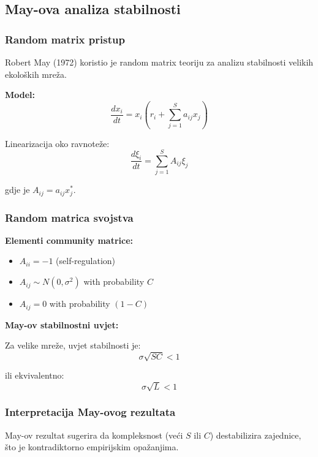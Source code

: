 \documentclass[11pt,oneside]{book}
\begin{document}
\subsection{May-ova analiza stabilnosti}

\subsubsection{Random matrix pristup}

Robert May (1972) koristio je random matrix teoriju za analizu stabilnosti velikih ekoloških mreža.

\textbf{Model:}
\begin{equation}
	\frac{dx_i}{dt} = x_i \left(r_i + \sum_{j=1}^{S} a_{ij} x_j\right)
\end{equation}

Linearizacija oko ravnoteže:
\begin{equation}
	\frac{d\xi_i}{dt} = \sum_{j=1}^{S} A_{ij} \xi_j
\end{equation}

gdje je $A_{ij} = a_{ij} x_j^*$.

\subsubsection{Random matrica svojstva}

\textbf{Elementi community matrice:}
\begin{itemize}
	\item $A_{ii} = -1$ (self-regulation)
	\item $A_{ij} \sim N(0, \sigma^2)$ with probability $C$
	\item $A_{ij} = 0$ with probability $(1-C)$
\end{itemize}

\textbf{May-ov stabilnostni uvjet:}

Za velike mreže, uvjet stabilnosti je:
\begin{equation}
	\sigma \sqrt{SC} < 1
\end{equation}

ili ekvivalentno:
\begin{equation}
	\sigma \sqrt{L} < 1
\end{equation}

\subsubsection{Interpretacija May-ovog rezultata}

May-ov rezultat sugerira da kompleksnost (veći $S$ ili $C$) destabilizira zajednice, što je kontradiktorno empirijskim opažanjima.
\end{document}
